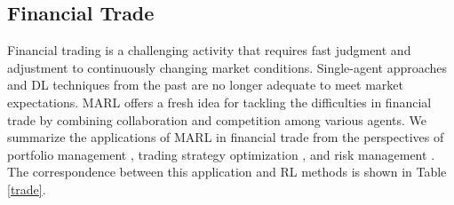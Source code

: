 \documentclass[acmsmall]{acmart}
\begin{document}
\subsection{Financial Trade}
Financial trading is a challenging activity that requires fast judgment and adjustment to continuously changing market conditions. Single-agent approaches and DL techniques from the past are no longer adequate to meet market expectations. MARL offers a fresh idea for tackling the difficulties in financial trade by combining collaboration and competition among various agents. We summarize the applications of MARL in financial trade from the perspectives of portfolio management \cite{Pham2021, lee2020maps, huang2022mspm, Ma2023, SHAVANDI2022118124}, trading strategy optimization \cite{9931995,qiu2021multi,patel2018optimizing,10.1145/3383455.3422570}, and risk management \cite{BAJO20126921, ganesh2019reinforcement, HE2023109985}. The correspondence between this application and RL methods is shown in Table \ref{trade}.
\end{document}
